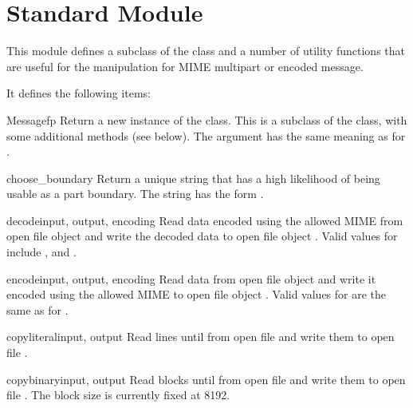 \section{Standard Module }
\label{module-mimetools}


This module defines a subclass of the  class and
a number of utility functions that are useful for the manipulation for
MIME multipart or encoded message.

It defines the following items:

\begin{classdesc}{Message}{fp}
Return a new instance of the  class.  This is a
subclass of the  class, with some additional
methods (see below).  The  argument has the same meaning
as for .
\end{classdesc}

\begin{funcdesc}{choose_boundary}{}
Return a unique string that has a high likelihood of being usable as a
part boundary.  The string has the form
.
\end{funcdesc}

\begin{funcdesc}{decode}{input, output, encoding}
Read data encoded using the allowed MIME  from open file
object  and write the decoded data to open file object
.  Valid values for  include
,  and .
\end{funcdesc}

\begin{funcdesc}{encode}{input, output, encoding}
Read data from open file object  and write it encoded using
the allowed MIME  to open file object .
Valid values for  are the same as for .
\end{funcdesc}

\begin{funcdesc}{copyliteral}{input, output}
Read lines until \EOF{} from open file  and write them to
open file .
\end{funcdesc}

\begin{funcdesc}{copybinary}{input, output}
Read blocks until \EOF{} from open file  and write them to
open file .  The block size is currently fixed at 8192.
\end{funcdesc}


